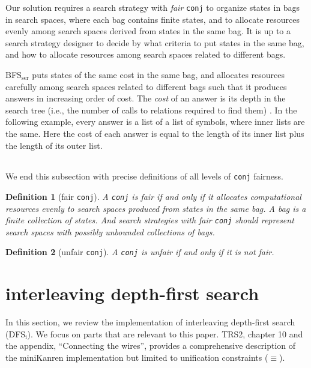 \documentclass[format=acmlarge, review=true, authordraft=true]{acmart}
\newcommand{\conj}{\texttt{conj}}
\newcommand{\DFSi }[0]{DFS$_\textrm{i}$}
\newcommand{\BFSser}[0]{BFS$_\textrm{ser}$}
\newtheorem{defn}{Definition}[section]
\begin{document}
Our solution requires a search strategy with \emph{fair} \conj{} to organize
states in bags in search spaces, where each bag contains finite states, and 
to allocate resources evenly among search spaces derived from states in the 
same bag. It is up to a search strategy designer to decide by what criteria to 
put states in the same bag, and how to allocate resources among search spaces 
related to different bags.

\BFSser{} puts states of the same cost in the same bag, and allocates
resources carefully among search spaces related to different bags such
that it produces answers in increasing order of cost. The \emph{cost}
of an answer is its depth in the search tree (i.e., the number of
calls to relations required to find them) \citep{seres1999algebra}. In
the following example, every answer is a list of a list of symbols,
where inner lists are the same. Here the cost of each answer is equal
to the length of its inner list plus the length of its outer list.

\begin{center}
	\begin{tabular}{c}
		
	\end{tabular}
\end{center}

We end this subsection with precise definitions of all levels of \conj{} 
fairness.

\begin{defn}[fair \conj{}]
A \conj{} is fair if and only if it allocates computational resources evenly to 
search spaces produced from states in the same bag. A bag is a finite 
collection of states. And search strategies with fair \conj{} should represent 
search spaces with possibly unbounded collections of bags. 
\end{defn}

\begin{defn}[unfair \conj{}]
A \conj{} is unfair if and only if it is not fair.
\end{defn}





\section{interleaving depth-first search}

In this section, we review the implementation of interleaving depth-first 
search (\DFSi). We focus on parts that are relevant to this paper. TRS2,
chapter 10 and the appendix, ``Connecting the wires'', 
provides a comprehensive description of the 
miniKanren 
implementation but limited to unification constraints ($\equiv$).
\end{document}
